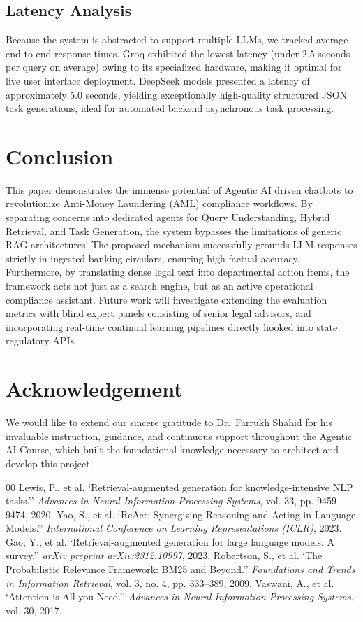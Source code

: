 ﻿\documentclass[conference]{IEEEtran}
\begin{document}
\subsection{Latency Analysis}
Because the system is abstracted to support multiple LLMs, we tracked average end-to-end response times. Groq exhibited the lowest latency (under 2.5 seconds per query on average) owing to its specialized hardware, making it optimal for live user interface deployment. DeepSeek models presented a latency of approximately 5.0 seconds, yielding exceptionally high-quality structured JSON task generations, ideal for automated backend asynchronous task processing.

\section{Conclusion}
This paper demonstrates the immense potential of Agentic AI driven chatbots to revolutionize Anti-Money Laundering (AML) compliance workflows. By separating concerns into dedicated agents for Query Understanding, Hybrid Retrieval, and Task Generation, the system bypasses the limitations of generic RAG architectures. The proposed mechanism successfully grounds LLM responses strictly in ingested banking circulars, ensuring high factual accuracy. Furthermore, by translating dense legal text into departmental action items, the framework acts not just as a search engine, but as an active operational compliance assistant. Future work will investigate extending the evaluation metrics with blind expert panels consisting of senior legal advisors, and incorporating real-time continual learning pipelines directly hooked into state regulatory APIs.

\section{Acknowledgement}
We would like to extend our sincere gratitude to Dr.\ Farrukh Shahid for his invaluable instruction, guidance, and continuous support throughout the Agentic AI Course, which built the foundational knowledge necessary to architect and develop this project.

\begin{thebibliography}{00}
 Lewis, P., et al. `Retrieval-augmented generation for knowledge-intensive NLP tasks.'' \emph{Advances in Neural Information Processing Systems}, vol. 33, pp. 9459--9474, 2020.
 Yao, S., et al. `ReAct: Synergizing Reasoning and Acting in Language Models.'' \emph{International Conference on Learning Representations (ICLR)}, 2023.
 Gao, Y., et al. `Retrieval-augmented generation for large language models: A survey.'' \emph{arXiv preprint arXiv:2312.10997}, 2023.
 Robertson, S., et al. `The Probabilistic Relevance Framework: BM25 and Beyond.'' \emph{Foundations and Trends in Information Retrieval}, vol. 3, no. 4, pp. 333--389, 2009.
 Vaswani, A., et al. `Attention is All you Need.'' \emph{Advances in Neural Information Processing Systems}, vol. 30, 2017.
\end{thebibliography}
\end{document}
